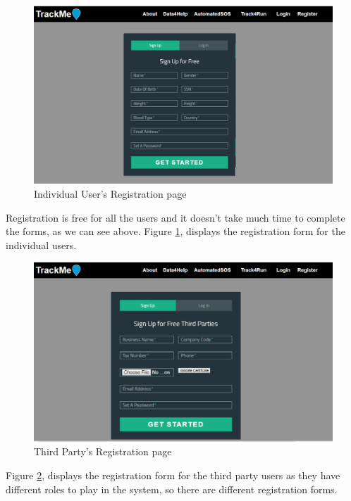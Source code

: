 \documentclass[a4paper, hidelinks, 12pt]{report}
\begin{document}
	\begin{figure}[H]
		\centering
		\includegraphics[width=1\textwidth]{../Assets/Register.png}
		\caption[UI: Individual User's Registration page]{Individual User's Registration page}
		\label{fig:Register}
	\end{figure}
	Registration is free for all the users and it doesn't take much time to complete the forms, as we can see above. Figure \ref{fig:Register}, displays the registration form for the individual users.
	
	\begin{figure}[H]
		\centering
		\includegraphics[width=1\textwidth]{../Assets/Register_third_party.png}
		\caption[UI: Third Party's Registration page]{Third Party's Registration page}
		\label{fig:Register_third_party}
	\end{figure}
	
	Figure \ref{fig:Register_third_party}, displays the registration form for the third party users as they have different roles to play in the system, so there are different registration forms.\\
	
\end{document}
